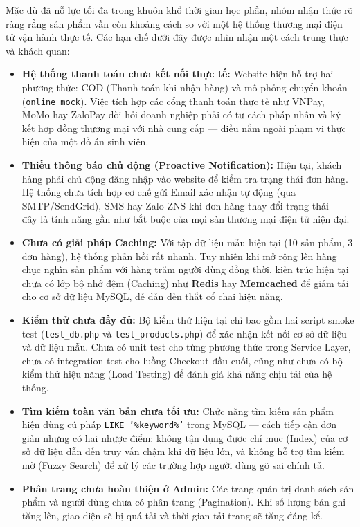 \documentclass[11pt, a4paper]{article}
\begin{document}
Mặc dù đã nỗ lực tối đa trong khuôn khổ thời gian học phần, nhóm nhận thức
rõ ràng rằng sản phẩm vẫn còn khoảng cách so với một hệ thống thương mại
điện tử vận hành thực tế. Các hạn chế dưới đây được nhìn nhận một cách trung
thực và khách quan:

\begin{itemize}[leftmargin=*]
    \item \textbf{Hệ thống thanh toán chưa kết nối thực tế:}
    Website hiện hỗ trợ hai phương thức: COD (Thanh toán khi nhận hàng) và
    mô phỏng chuyển khoản (\texttt{online\_mock}). Việc tích hợp các cổng
    thanh toán thực tế như VNPay, MoMo hay ZaloPay đòi hỏi doanh nghiệp
    phải có tư cách pháp nhân và ký kết hợp đồng thương mại với nhà cung
    cấp --- điều nằm ngoài phạm vi thực hiện của một đồ án sinh viên.

    \item \textbf{Thiếu thông báo chủ động (Proactive Notification):}
    Hiện tại, khách hàng phải chủ động đăng nhập vào website để kiểm tra
    trạng thái đơn hàng. Hệ thống chưa tích hợp cơ chế gửi Email xác nhận
    tự động (qua SMTP/SendGrid), SMS hay Zalo ZNS khi đơn hàng thay đổi
    trạng thái --- đây là tính năng gần như bắt buộc của mọi sàn thương mại
    điện tử hiện đại.

    \item \textbf{Chưa có giải pháp Caching:}
    Với tập dữ liệu mẫu hiện tại (10 sản phẩm, 3 đơn hàng), hệ thống phản
    hồi rất nhanh. Tuy nhiên khi mở rộng lên hàng chục nghìn sản phẩm với
    hàng trăm người dùng đồng thời, kiến trúc hiện tại chưa có lớp bộ nhớ
    đệm (Caching) như \textbf{Redis} hay \textbf{Memcached} để giảm tải cho
    cơ sở dữ liệu MySQL, dễ dẫn đến thắt cổ chai hiệu năng.

    \item \textbf{Kiểm thử chưa đầy đủ:}
    Bộ kiểm thử hiện tại chỉ bao gồm hai script smoke test
    (\texttt{test\_db.php} và \texttt{test\_products.php}) để xác nhận kết
    nối cơ sở dữ liệu và dữ liệu mẫu. Chưa có unit test cho từng phương
    thức trong Service Layer, chưa có integration test cho luồng Checkout
    đầu-cuối, cũng như chưa có bộ kiểm thử hiệu năng (Load Testing) để
    đánh giá khả năng chịu tải của hệ thống.

    \item \textbf{Tìm kiếm toàn văn bản chưa tối ưu:}
    Chức năng tìm kiếm sản phẩm hiện dùng cú pháp
    \texttt{LIKE '\%keyword\%'} trong MySQL --- cách tiếp cận đơn giản nhưng
    có hai nhược điểm: không tận dụng được chỉ mục (Index) của cơ sở dữ
    liệu dẫn đến truy vấn chậm khi dữ liệu lớn, và không hỗ trợ tìm kiếm
    mờ (Fuzzy Search) để xử lý các trường hợp người dùng gõ sai chính tả.

    \item \textbf{Phân trang chưa hoàn thiện ở Admin:}
    Các trang quản trị danh sách sản phẩm và người dùng chưa có phân trang
    (Pagination). Khi số lượng bản ghi tăng lên, giao diện sẽ bị quá tải
    và thời gian tải trang sẽ tăng đáng kể.
\end{itemize}
\end{document}
